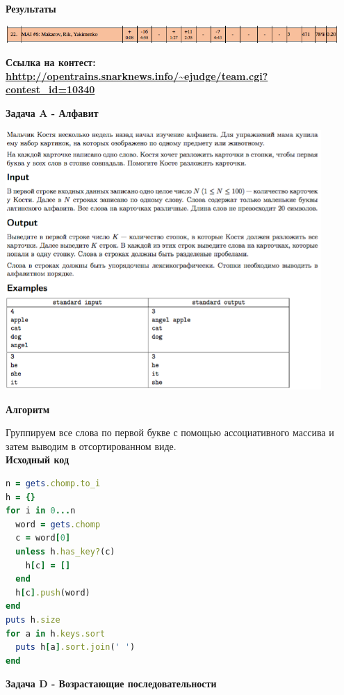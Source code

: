 \documentclass[a4paper,12pt]{article}
\begin{document}
\textbf{{\large Результаты}} \\
\begin{center}
\includegraphics[width=0.95\textwidth]{OC_Saratov/result.png}\\ [1cm]
\end{center}

\textbf{{\large Ссылка на контест: \url{hhttp://opentrains.snarknews.info/~ejudge/team.cgi?contest_id=10340}}}

\newpage
\textbf{{\large Задача A - Алфавит}}

\begin{center}
\includegraphics[width=0.9\textwidth]{OC_Saratov/A.png}\\ [1cm]
\end{center}

\textbf{{\large Алгоритм}}

Группируем все слова по первой букве с помощью ассоциативного массива и затем выводим в отсортированном виде. \\

\textbf{{\large Исходный код}} \\
\begin{lstlisting}[language=Ruby]
n = gets.chomp.to_i
h = {}
for i in 0...n
  word = gets.chomp
  c = word[0]
  unless h.has_key?(c)
    h[c] = []
  end
  h[c].push(word)
end
puts h.size
for a in h.keys.sort
  puts h[a].sort.join(' ')
end
\end{lstlisting}


\newpage
\textbf{{\large Задача D - Возрастающие последовательности}}
\end{document}
